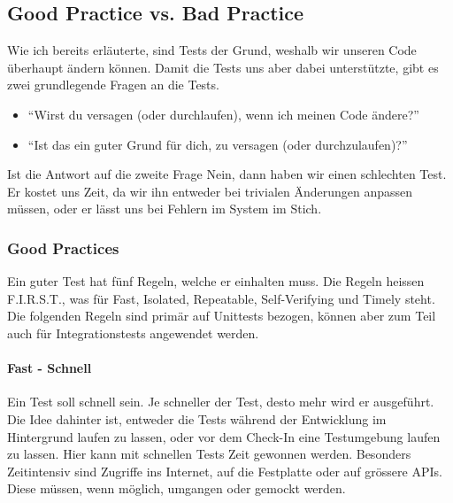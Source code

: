 \subsection{Good Practice vs. Bad Practice} \label{goodvsbad}
Wie ich bereits erläuterte, sind Tests der Grund, weshalb wir unseren Code überhaupt ändern können. Damit die Tests uns aber dabei unterstützte, gibt es zwei grundlegende Fragen an die Tests.
\begin{itemize}
\item \enquote{Wirst du versagen (oder durchlaufen), wenn ich meinen Code ändere?}
\item \enquote{Ist das ein guter Grund für dich, zu versagen (oder durchzulaufen)?}
\end{itemize}
Ist die Antwort auf die zweite Frage Nein, dann haben wir einen schlechten Test. Er kostet uns Zeit, da wir ihn entweder bei trivialen Änderungen anpassen müssen, oder er lässt uns bei Fehlern im System im Stich.
\subsubsection{Good Practices} \label{Good Practices}
Ein guter Test hat fünf Regeln, welche er einhalten muss. Die Regeln heissen F.I.R.S.T., was für Fast, Isolated, Repeatable, Self-Verifying und Timely steht. Die folgenden Regeln sind primär auf Unittests bezogen, können aber zum Teil auch für Integrationstests angewendet werden.
\paragraph{Fast - Schnell}
Ein Test soll schnell sein. Je schneller der Test, desto mehr wird er ausgeführt. Die Idee dahinter ist, entweder die Tests während der Entwicklung im Hintergrund laufen zu lassen, oder vor dem Check-In eine Testumgebung laufen zu lassen. Hier kann mit schnellen Tests Zeit gewonnen werden. Besonders Zeitintensiv sind Zugriffe ins Internet, auf die Festplatte oder auf grössere APIs. Diese müssen, wenn möglich, umgangen oder gemockt werden.
